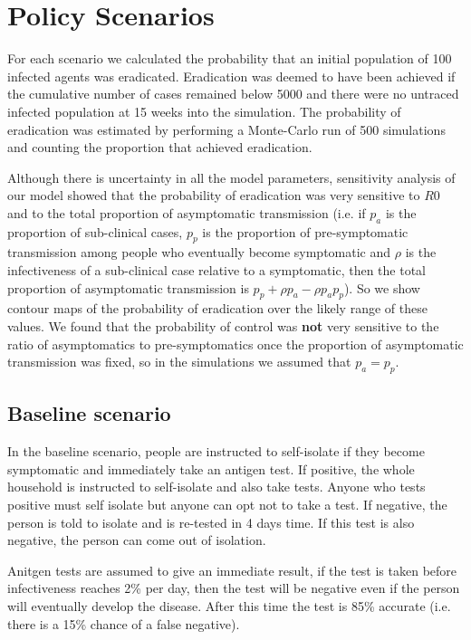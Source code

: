 \documentclass{article}
\begin{document}
\section{Policy Scenarios}

For each scenario we calculated the probability that an initial population of 100 infected agents was eradicated. Eradication was deemed to have been achieved if the cumulative number of cases remained below 5000 and there were no untraced infected population at 15 weeks into the simulation. The probability of eradication was estimated by performing a Monte-Carlo run of 500 simulations and counting the proportion that achieved eradication.

Although there is uncertainty in all the model parameters, sensitivity analysis of our model showed that the probability of eradication was very sensitive to $R0$ and to the total proportion of asymptomatic transmission (i.e. if $p_a$ is the proportion of sub-clinical cases, $p_p$ is the proportion of pre-symptomatic transmission among people who eventually become symptomatic and $\rho$ is the infectiveness of a sub-clinical case relative to a symptomatic, then the total proportion of asymptomatic transmission is $p_p + \rho  p_a - \rho p_ap_p$). So we show contour maps of the probability of eradication over the likely range of these values. We found that the probability of control was \textbf{not} very sensitive to the ratio of asymptomatics to pre-symptomatics once the proportion of asymptomatic transmission was fixed, so in the simulations we assumed that $p_a = p_p$.

\subsection{Baseline scenario}

In the baseline scenario, people are instructed to self-isolate if they become symptomatic and immediately take an antigen test. If positive, the whole household is instructed to self-isolate and also take tests. Anyone who tests positive must self isolate but anyone can opt not to take a test. If negative, the person is told to isolate and is re-tested in 4 days time. If this test is also negative, the person can come out of isolation.

Anitgen tests are assumed to give an immediate result, if the test is taken before infectiveness reaches 2\% per day, then the test will be negative even if the person will eventually develop the disease. After this time the test is 85\% accurate (i.e. there is a 15\% chance of a false negative).
\end{document}
